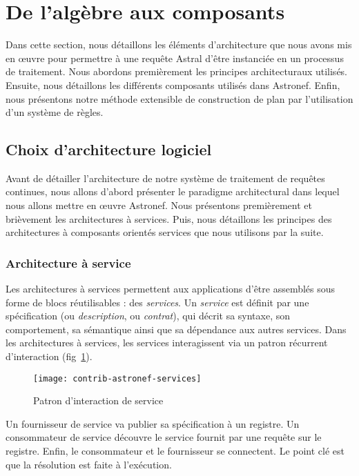 \section{De l'algèbre aux composants}\label{sec:contrib:astronef:architecture}
Dans cette section, nous détaillons les éléments d'architecture que nous avons mis en œuvre pour permettre à une requête Astral d'être instanciée en un processus de traitement. Nous abordons premièrement les principes architecturaux utilisés. Ensuite, nous détaillons les différents composants utilisés dans Astronef. Enfin, nous présentons notre méthode extensible de construction de plan par l'utilisation d'un système de règles.
\subsection{Choix d'architecture logiciel}
Avant de détailler l'architecture de notre système de traitement de requêtes continues, nous allons d'abord présenter le paradigme architectural dans lequel nous allons mettre en œuvre Astronef. Nous présentons premièrement et brièvement les architectures à services. Puis, nous détaillons les principes des architectures à composants orientés services que nous utilisons par la suite.
\subsubsection{Architecture à service}
Les architectures à services permettent aux applications d'être assemblés sous forme de blocs réutilisables : des \textit{services}. Un \textit{service} est définit par une spécification (ou \textit{description}, ou \textit{contrat}), qui décrit sa syntaxe, son comportement, sa sémantique ainsi que sa dépendance aux autres services. Dans les architectures à services, les services interagissent via un patron récurrent d'interaction (fig~\ref{fig:contrib:astronef:services}). 
\begin{figure}[ht]
    \centering
    \texttt{[image: contrib-astronef-services]}
    \caption{Patron d'interaction de service}\label{fig:contrib:astronef:services}
\end{figure}
Un fournisseur de service va publier sa spécification à un registre. Un consommateur de service découvre le service fournit par une requête sur le registre. Enfin, le consommateur et le fournisseur se connectent. Le point clé est que la résolution est faite à l'exécution.

